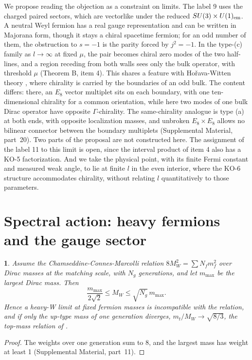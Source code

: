 \documentclass[aps,prd,reprint,onecolumn,nofootinbib,amsmath,amssymb,floatfix]{revtex4-2}
\theoremstyle{plain}
\newcommand{\resultname}{}
\newtheorem*{resultenv}{\resultname}
\newenvironment{result}[1]{\renewcommand{\resultname}{#1}\begin{resultenv}}{\end{resultenv}}
\newcommand{\supp}[1]{Supplemental Material, part~#1}
\begin{document}
We propose reading the objection as a constraint on limits. The label 9 uses the charged paired sectors, which are vectorlike under the reduced $SU(3)\times U(1)_{\rm em}$. A neutral Weyl fermion has a real gauge representation and can be written in Majorana form, though it stays a chiral spacetime fermion; for an odd number of them, the obstruction to $s=-1$ is the parity forced by $j^2=-1$. In the type-(c) family as $l\to\infty$ at fixed $\mu$, the pair becomes chiral zero modes of the two half-lines, and a region receding from both walls sees only the bulk operator, with threshold $\mu$ (Theorem B, item 4). This shares a feature with Ho\v{r}ava-Witten theory \cite{HW1996}, where chirality is carried by the boundaries of an odd bulk. The content differs: there, an $E_8$ vector multiplet sits on each boundary, with one ten-dimensional chirality for a common orientation, while here two modes of one bulk Dirac operator have opposite $\Gamma$-chirality. The same-chirality analogue is type (a) at both ends, with opposite localization masses, and unbroken $E_8\times E_8$ allows no bilinear connector between the boundary multiplets (\supp{20}). Two parts of the proposal are not constructed here. The assignment of the label 11 to this limit is open, since the interval product of item 4 also has a KO-5 factorization. And we take the physical point, with its finite Fermi constant and measured weak angle, to lie at finite $l$ in the even interior, where the KO-6 structure accommodates chirality, without relating $l$ quantitatively to those parameters.

\section{Spectral action: heavy fermions and the gauge sector}

\begin{result}{Proposition E}
Assume the Chamseddine-Connes-Marcolli relation $8M_W^2=\sum N_fm_f^2$ over Dirac masses at the matching scale, with $N_g$ generations, and let $m_{\max}$ be the largest Dirac mass. Then
\begin{equation}
\frac{m_{\max}}{2\sqrt2}\le M_W\le\sqrt{N_g}\,m_{\max}.
\end{equation}
Hence a heavy-W limit at fixed fermion masses is incompatible with the relation, and if only the up-type mass of one generation diverges, $m_t/M_W\to\sqrt{8/3}$, the top-mass relation of \cite{CCM2007}.
\end{result}

\begin{proof}
The weights over one generation sum to 8, and the largest mass has weight at least 1 (\supp{11}).
\end{proof}
\end{document}
